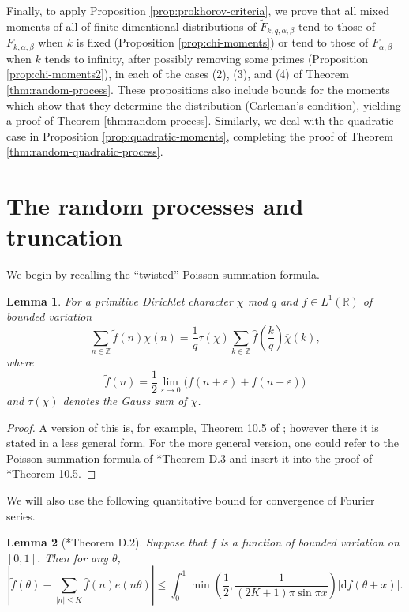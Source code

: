 \documentclass[12pt, a4paper]{amsart}
\newtheorem{lemma}{Lemma}
\theoremstyle{remark}
\newcommand{\R}{\ensuremath{\mathbb{R}}}
\newcommand{\Z}{\ensuremath{\mathbb{Z}}}
\newcommand{\ud}{\mathrm{d}}
\newcommand{\abs}[1]{\left|#1\right|}
\newcommand{\chibar}{\overline \chi}
\begin{document}
Finally, to apply Proposition \ref{prop:prokhorov-criteria}, we prove that
all mixed moments of all of finite dimentional distributions of
$\tilde F_{k,q,\alpha,\beta}$ tend to those of $F_{k,\alpha,\beta}$ when
$k$ is fixed (Proposition \ref{prop:chi-moments}) or tend to those of
$F_{\alpha,\beta}$ when $k$ tends to infinity, after possibly removing some primes (Proposition \ref{prop:chi-moments2}),
in each of the cases (2), (3), and (4) of Theorem \ref{thm:random-process}. These propositions also include bounds
for the moments which show that they determine the distribution (Carleman's condition),
yielding a proof of Theorem \ref{thm:random-process}. Similarly, we deal with the
quadratic case in Proposition \ref{prop:quadratic-moments}, completing the
proof of Theorem \ref{thm:random-quadratic-process}.




  

\section{The random processes and truncation}

We begin by recalling the ``twisted'' Poisson summation formula.
\begin{lemma}\label{lemma:poisson}
    For a primitive Dirichlet character $\chi$ mod $q$ and $f \in L^1(\R)$ of
    bounded variation
    \[
        \sum_{n \in \Z} \tilde f(n) \chi(n)
            = \frac{1}{q} \tau(\chi) \sum_{k \in \Z} \hat f\left(\frac{k}{q}\right) \chibar(k),
    \]
    where
    \[
    \tilde f(n) = \frac{1}{2}\lim_{\varepsilon \rightarrow 0}\big(f(n + \varepsilon) + f(n-\varepsilon)\big)
    \]
    and $\tau(\chi)$ denotes the Gauss sum of $\chi$. 
\end{lemma}
\begin{proof}
    A version of this is, for example, Theorem 10.5 of \cite{kookoobook};
    however there it is stated in a less general form. For the more general
    version, one could refer to the Poisson summation formula of
    \cite{MV}*{Theorem D.3} and insert it into the proof of
    \cite{kookoobook}*{Theorem 10.5}.
\end{proof}

We will also use the following quantitative bound for convergence of Fourier
series.
\begin{lemma}[\cite{MV}*{Theorem D.2}]\label{lemma:fourierbound}
    Suppose that $f$ is a function of bounded variation on $[0,1]$. Then for
    any $\theta$,
\[
    \abs{\tilde f(\theta) - \sum_{\abs{n} \le K}\hat f(n) e(n\theta)}
    \le \int_0^1 \min\left(\frac{1}{2}, \frac{1}{(2K + 1)\pi \sin \pi x}\right) \abs{\ud f(\theta + x)}.
\]
\end{lemma}
\end{document}
